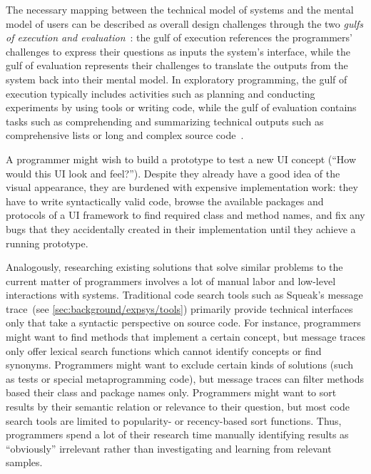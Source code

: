 The necessary mapping between the technical model of systems and the mental model of users can be described as overall design challenges through the two \emph{gulfs of execution and evaluation}~\cite{norman1986cognitive}:
the gulf of execution references the programmers' challenges to express their questions as inputs the system's interface, while the gulf of evaluation represents their challenges to translate the outputs from the system back into their mental model.
In exploratory programming, the gulf of execution typically includes activities such as planning and conducting experiments by using tools or writing code, while the gulf of evaluation contains tasks such as comprehending and summarizing technical outputs such as comprehensive lists or long and complex source code~\cite{rein2020empirical}.

\begin{example}
	A programmer might wish to build a prototype to test a new UI concept (``How would this UI look and feel?'').
	Despite they already have a good idea of the visual appearance, they are burdened with expensive implementation work:
	they have to write syntactically valid code, browse the available packages and protocols of a UI framework to find required class and method names, and fix any bugs that they accidentally created in their implementation until they achieve a running prototype.

	Analogously, researching existing solutions that solve similar problems to the current matter of programmers involves a lot of manual labor and low-level interactions with systems.
	Traditional code search tools such as Squeak's message trace~(see \cref{sec:background/expsys/tools}) primarily provide technical interfaces only that take a syntactic perspective on source code.
	For instance, programmers might want to find methods that implement a certain concept, but message traces only offer lexical search functions which cannot identify concepts or find synonyms.
	Programmers might want to exclude certain kinds of solutions (such as tests or special metaprogramming code), but message traces can filter methods based their class and package names only.
	Programmers might want to sort results by their semantic relation or relevance to their question, but most code search tools are limited to popularity- or recency-based sort functions.
	Thus, programmers spend a lot of their research time manually identifying results as ``obviously'' irrelevant rather than investigating and learning from relevant samples.
\end{example}

